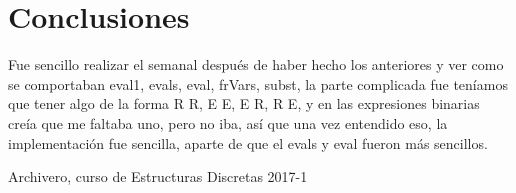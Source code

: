 \documentclass[spanish,12pt,letterpaper]{article}
\begin{document}
\section{Conclusiones}
Fue sencillo realizar el semanal después de haber hecho los anteriores y ver
como se comportaban eval1, evals, eval, frVars, subst, la parte complicada fue
teníamos que tener algo de la forma R R, E E, E R, R E, y en las expresiones
binarias creía que me faltaba uno, pero no iba, así que una vez entendido eso,
la implementación fue sencilla, aparte de que el evals y eval fueron más sencillos.
\begin{thebibliography}{9}

  Archivero, curso de Estructuras Discretas 2017-1
\end{thebibliography}
\end{document}
